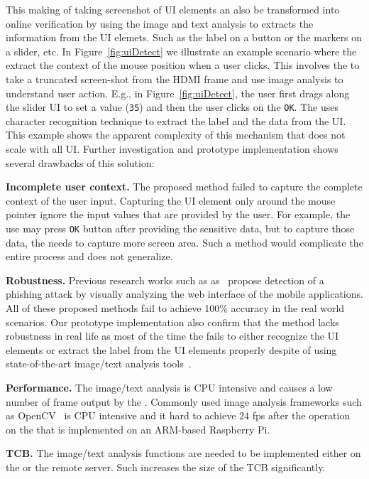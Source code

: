 This making of taking screenshot of UI elements an also be transformed into online verification by using the image and text analysis to extracts the information from the UI elemets. Such as the label on a button or the markers on a slider, etc. In Figure~\ref{fig:uiDetect} we illustrate an example scenario where the \device extract the context of the mouse position when a user clicks. This involves the \device to take a truncated screen-shot from the HDMI frame and use image analysis to understand user action. E.g., in Figure~\ref{fig:uiDetect}, \one the user first drags along the slider UI to set a value (\texttt{35}) and then \two the user clicks on the \texttt{OK}. The \device uses character recognition technique to extract the label and the data from the UI. This example shows the apparent complexity of this mechanism that does not scale with all UI. Further investigation and prototype implementation shows several drawbacks of this solution:


\begin{mylist}
  \item \textbf{Incomplete user context.} The proposed method failed to capture the complete context of the user input. Capturing the UI element only around the mouse pointer ignore the input values that are provided by the user. For example, the use may press \texttt{OK} button after providing the sensitive data, but to capture those data, the \device needs to capture more screen area. Such a method would complicate the entire process and does not generalize.
  \item \textbf{Robustness.} Previous research works such as as~\cite{lukaSpoof,Chen:2010:DVS:1754393.1754394} propose detection of a phishing attack by visually analyzing the web interface of the mobile applications. All of these proposed methods fail to achieve 100\% accuracy in the real world scenarios. Our prototype implementation also confirm that the method lacks robustness in real life as most of the time the \device fails to either recognize the UI elements or extract the label from the UI elements properly despite of using state-of-the-art image/text analysis tools~\cite{opencv}.
  \item \textbf{Performance.} The image/text analysis is CPU intensive and causes a low number of frame output by the \device. Commonly used image analysis frameworks such as OpenCV~\cite{opencv} is CPU intensive and it hard to achieve $24$ fps after the operation on the \device that is implemented on an ARM-based Raspberry Pi.
  \item \textbf{TCB.} The image/text analysis functions are needed to be implemented either on the \device or the remote server. Such increases the size of the TCB significantly.
\end{mylist}

